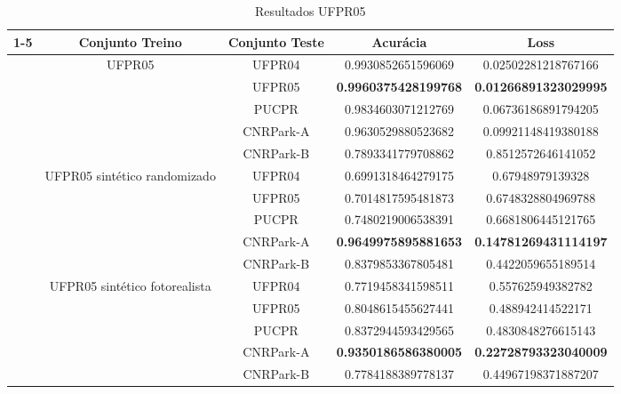 \begin{table}[!htp] 
\centering
\caption{Resultados UFPR05}
\label{tab:UFPR05}
\begin{tabular}{|c|cccc|}
\cline{1-5}
\multicolumn{1}{|}{} & Conjunto Treino & Conjunto Teste & Acurácia & Loss \\
\hline
\texttt{} & UFPR05 & UFPR04 & 0.9930852651596069 & 0.02502281218767166 \\
\texttt{} &  & UFPR05 & \textbf{0.9960375428199768} & \textbf{0.01266891323029995} \\
\texttt{} &  & PUCPR & 0.9834603071212769 & 0.06736186891794205 \\
\texttt{} &  & CNRPark-A & 0.9630529880523682 & 0.09921148419380188\\
\texttt{} &  & CNRPark-B & 0.7893341779708862 & 0.8512572646141052 \\
\hline
\texttt{} & UFPR05 sintético randomizado & UFPR04 & 0.6991318464279175 & 0.67948979139328 \\
\texttt{} &  & UFPR05 & 0.7014817595481873 & 0.6748328804969788 \\
\texttt{} &  & PUCPR & 0.7480219006538391 & 0.6681806445121765 \\
\texttt{} &  & CNRPark-A & \textbf{0.9649975895881653} & \textbf{0.14781269431114197} \\
\texttt{} &  & CNRPark-B & 0.8379853367805481 & 0.4422059655189514 \\
\hline
\texttt{} & UFPR05 sintético fotorealista & UFPR04 & 0.7719458341598511 & 0.557625949382782 \\
\texttt{} &  & UFPR05 & 0.8048615455627441 & 0.488942414522171\\
\texttt{} &  & PUCPR & 0.8372944593429565 & 0.4830848276615143 \\
\texttt{} &  & CNRPark-A & \textbf{0.9350186586380005} & \textbf{0.22728793323040009} \\
\texttt{} &  & CNRPark-B & 0.7784188389778137 & 0.44967198371887207 \\
\hline
\end{tabular}
\end{table}

